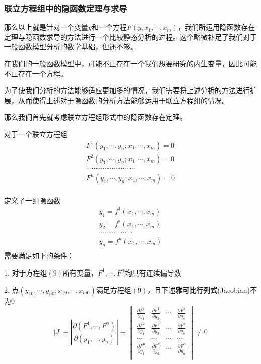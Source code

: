 \documentclass[UTF8,12pt]{ctexart}
\numberwithin{equation}{section} %
\numberwithin{figure}{section}
\numberwithin{table}{section}
\begin{document}
	\subsubsection{联立方程组中的隐函数定理与求导}
	那么以上就是针对一个变量$y$和一个方程$F(y,x_1,\cdots,x_m)$，我们所运用隐函数存在定理与隐函数求导的方法进行一个比较静态分析的过程。这个略微补足了我们对于一般函数模型分析的数学基础，但还不够。
	
	在我们的一般函数模型中，可能不止存在一个我们想要研究的内生变量，因此可能不止存在一个方程。
	
	为了使我们分析的方法能够适应更加多的情况，我们需要将上述分析的方法进行扩展，从而使得上述对于隐函数的分析方法能够运用于联立方程组的情况。
	
	那么我们首先就考虑联立方程组形式中的隐函数存在定理。
	
	对于一个联立方程组
	\begin{equation}
		\begin{aligned}
			F^1(y_1,\cdots,y_n;x_1,\cdots,x_m) = 0 \\
			F^2(y_1,\cdots,y_n;x_1,\cdots,x_m) = 0 \\
			\cdots \cdots \cdots \cdots \cdots \cdots \cdots \cdots \cdots \\
			F^n(y_1,\cdots,y_n;x_1,\cdots,x_m) = 0 \\
		\end{aligned} 
	\end{equation}
	
	定义了一组隐函数
	\begin{equation}
		\begin{aligned}
			y_1 = f^1(x_1,\cdots,x_m) \\
			y_2 = f^2(x_1,\cdots,x_m) \\
			\cdots \cdots \cdots \cdots \cdots \cdots  \\
			y_n = f^n(x_1,\cdots,x_m) \\
		\end{aligned}
	\end{equation}
	需要满足如下的条件：
	
	1. 对于方程组$(9)$所有变量，$F^1,\cdots,F^n$均具有连续偏导数
	
	2. 点$(y_{10},\cdots,y_{n0};x_{10},\cdots,x_{m0})$满足方程组$(9)$，且下述\textbf{雅可比行列式}(Jacobian)不为0
	\begin{equation}
		|J| \equiv |\frac{\partial (F^1,\cdots,F^n)}{\partial (y_1,\cdots,y_n)}| \equiv
		\begin{vmatrix}
			\frac{\partial F^1}{\partial y_1} & \frac{\partial F^1}{\partial y_2} & \cdots & \frac{\partial F^1}{\partial y_n} \\
			\frac{\partial F^2}{\partial y_1} & \frac{\partial F^2}{\partial y_2} & \cdots & \frac{\partial F^2}{\partial y_n} \\
			\cdots &\cdots&\cdots &\cdots  \\
			\frac{\partial F^n}{\partial y_1} & \frac{\partial F^n}{\partial y_2} & \cdots & \frac{\partial F^n}{\partial y_n} \\
		\end{vmatrix}
		\neq 0
	\end{equation}
	
\end{document}
